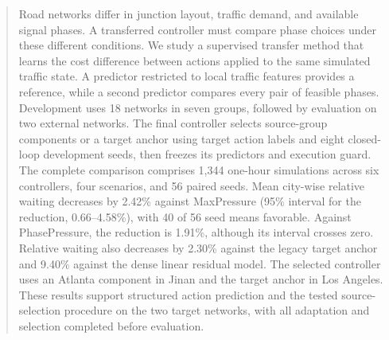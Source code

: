 \begin{abstract}
Road networks differ in junction layout, traffic demand, and available signal phases. A transferred controller must compare phase choices under these different conditions. We study a supervised transfer method that learns the cost difference between actions applied to the same simulated traffic state. A predictor restricted to local traffic features provides a reference, while a second predictor compares every pair of feasible phases. Development uses 18 networks in seven groups, followed by evaluation on two external networks. The final controller selects source-group components or a target anchor using target action labels and eight closed-loop development seeds, then freezes its predictors and execution guard. The complete comparison comprises 1,344 one-hour simulations across six controllers, four scenarios, and 56 paired seeds. Mean city-wise relative waiting decreases by 2.42\% against MaxPressure (95\% interval for the reduction, 0.66--4.58\%), with 40 of 56 seed means favorable. Against PhasePressure, the reduction is 1.91\%, although its interval crosses zero. Relative waiting also decreases by 2.30\% against the legacy target anchor and 9.40\% against the dense linear residual model. The selected controller uses an Atlanta component in Jinan and the target anchor in Los Angeles. These results support structured action prediction and the tested source-selection procedure on the two target networks, with all adaptation and selection completed before evaluation.
\end{abstract}
